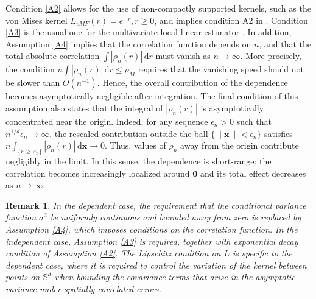 \documentclass[12pt]{report} %
\newtheorem{remark}{Remark}
\newcommand{\bx}{\mathbf{x}}
\newcommand{\rd}{\mathrm{d}}
\begin{document}
Condition \ref{A2} allows for the use of non-compactly supported kernels, such as the von Mises kernel $L_{vMF}(r)=e^{-r}, r \geq0$, and implies condition A2 in \citep{Garcia-Portugues2015}. Condition \ref{A3} is the usual one for the multivariate local linear estimator \citep{ruppert1994multivariate}. In addition, Assumption \ref{A4} implies that the correlation function depends on $n$, and that the total absolute correlation $\int \left|\rho_n(r)\right|\,\rd r$ must vanish as $n\to\infty$. More precisely, the condition $n \int |\rho_n(r)|\,\rd r\le \rho_M$ requires that the vanishing speed should not be slower than $O\left(n^{-1}\right)$. Hence, the overall contribution of the dependence becomes asymptotically negligible after integration. The final condition of this assumption also states that the integral of $\left|\rho_n(r)\right|$ is asymptotically concentrated near the origin. Indeed, for any sequence $\epsilon_n>0$ such that$n^{1/d}\epsilon_n\to\infty$, the rescaled contribution outside the ball
$\{\|\bx\|<\epsilon_n\}$ satisfies $n\int_{\{r\,\geq\,\varepsilon_n\}}\left|\rho_n(r)\right|\,\rd\bx
\to 0$. Thus, values of $\rho_n$ away from the origin contribute negligibly in the limit. In this sense, the dependence is short-range: the correlation becomes increasingly localized around $\mathbf{0}$ and its total effect decreases as
$n\to\infty$.



\begin{remark}
    In the dependent case, the requirement that the conditional variance function $\sigma^2$ be uniformly continuous and bounded away from zero is replaced by Assumption \ref{A4}, which imposes conditions on the correlation function. In the independent case, Assumption \ref{A3} is required, together with exponential decay condition of Assumption \ref{A2}. The Lipschitz condition on $L$ is specific to the dependent case, where it is required to control the variation of the kernel between points on $\mathbb{S}^d$ when bounding the covariance terms that arise in the asymptotic variance under spatially correlated errors.
\end{remark}
\end{document}
